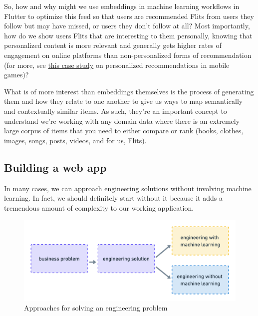\documentclass[11pt]{diazessay} %
\begin{document}
So, how and why might we use embeddings in machine learning workflows in Flutter to optimize this feed so that users are recommended Flits from users they follow but may have missed, or users they don’t follow at all?  Most importantly, how do we show users Flits that are interesting to them personally, knowing that personalized content is more relevant and generally gets higher rates of engagement\citep{jannach2010recommender}  on online platforms than non-personalized forms of recommendation (for more, see  \href{http://www.recommenderbook.net/media/Recommender_Systems_An_Introduction_Chapter08_Case_study.pdf}{this case study} on personalized recommendations in mobile games)? 

What is of more interest than embeddings themselves is the process of generating them and how they relate to one another to give us ways to map semantically and contextually similar items. As such, they’re an important concept to understand we're working with any domain data where there is an extremely large corpus of items that you need to either compare or rank (books, clothes, images, songs, posts, videos, and for us, Flits).


\subsection{Building a web app}
In many cases, we can approach engineering solutions without involving machine learning. In fact, we should definitely start without it\citep{zinkevich2017rules} because it adds a tremendous amount of complexity to our working application\citep{sculley2014machine}. 

\begin{figure}[!ht]
\centering
\includegraphics[width=\textwidth]{figures/solutions.png}
\caption{Approaches for solving an engineering problem }
\end{figure}
\end{document}

